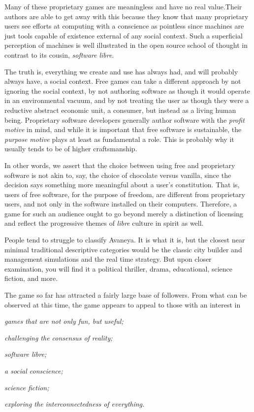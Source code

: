 Many of these proprietary games are meaningless and have no real value. Their authors are able to get away with this because they know that many proprietary users see efforts at computing with a conscience as pointless since machines are just tools capable of existence external of any social context. Such a superficial perception of machines is well illustrated in the open source school of thought in contrast to its cousin, {\it software libre}. 

The truth is, everything we create and use has always had, and will probably always have, a social context. Free games can take a different approach by not ignoring the social context, by not authoring software as though it would operate in an environmental vacuum, and by not treating the user as though they were a reductive abstract economic unit, a consumer, but instead as a living human being. Proprietary software developers generally author software with the {\it profit motive} in mind, and while it is important that free software is sustainable, the {\it purpose motive} plays at least as fundamental a role. This is probably why it usually tends to be of higher craftsmanship.

In other words, we assert that the choice between using free and proprietary software is not akin to, say, the choice of chocolate versus vanilla, since the decision says something more meaningful about a user's constitution. That is, users of free software, for the purpose of freedom, are different from proprietary users, and not only in the software installed on their computers. Therefore, a game for such an audience ought to go beyond merely a distinction of licensing and reflect the progressive themes of {\it libre} culture in spirit as well.

People tend to struggle to classify Avaneya. It is what it is, but the closest near minimal traditional descriptive categories would be the classic city builder and management simulations and the real time strategy. But upon closer examination, you will find it a political thriller, drama, educational, science fiction, and more.

The game so far has attracted a fairly large base of followers. From what can be observed at this time, the game appears to appeal to those with an interest in

\startitemize[4]
\item
{\it games that are not only fun, but useful;}
\item
{\it challenging the consensus of reality;}
\item
{\it software libre;}
\item
{\it a social conscience;}
\item
{\it science fiction;}
\item
{\it exploring the interconnectedness of everything.}
\stopitemize

